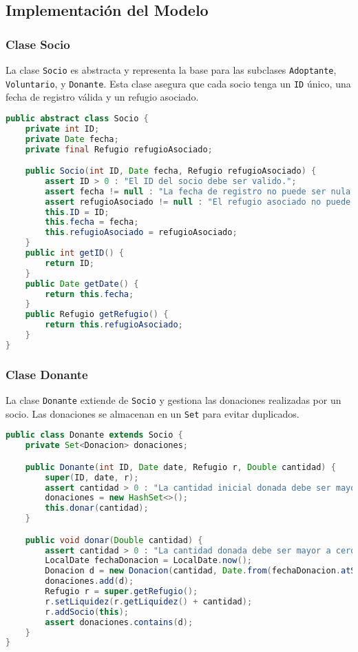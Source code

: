 \subsection{Implementación del Modelo}

\subsubsection{Clase Socio}
La clase \texttt{Socio} es abstracta y representa la base para las subclases \texttt{Adoptante}, \texttt{Voluntario}, y \texttt{Donante}. Esta clase asegura que cada socio tenga un \texttt{ID} único, una fecha de registro válida y un refugio asociado.

\begin{lstlisting}[language=Java]
public abstract class Socio {
    private int ID; 
    private Date fecha;
    private final Refugio refugioAsociado;

    public Socio(int ID, Date fecha, Refugio refugioAsociado) {
        assert ID > 0 : "El ID del socio debe ser valido.";
        assert fecha != null : "La fecha de registro no puede ser nula.";
        assert refugioAsociado != null : "El refugio asociado no puede ser nulo.";
        this.ID = ID;
        this.fecha = fecha;
        this.refugioAsociado = refugioAsociado;
    }
    public int getID() {
        return ID;
    }
    public Date getDate() {
        return this.fecha;
    }
    public Refugio getRefugio() {
        return this.refugioAsociado;
    }
}
\end{lstlisting}

\subsubsection{Clase Donante}
La clase \texttt{Donante} extiende de \texttt{Socio} y gestiona las donaciones realizadas por un socio. Las donaciones se almacenan en un \texttt{Set} para evitar duplicados.

\begin{lstlisting}[language=Java]
public class Donante extends Socio {
    private Set<Donacion> donaciones;

    public Donante(int ID, Date date, Refugio r, Double cantidad) {
        super(ID, date, r);
        assert cantidad > 0 : "La cantidad inicial donada debe ser mayor a cero.";
        donaciones = new HashSet<>();
        this.donar(cantidad);
    }

    public void donar(Double cantidad) {
        assert cantidad > 0 : "La cantidad donada debe ser mayor a cero.";
        LocalDate fechaDonacion = LocalDate.now();
        Donacion d = new Donacion(cantidad, Date.from(fechaDonacion.atStartOfDay(ZoneId.systemDefault()).toInstant()), this);
        donaciones.add(d);
        Refugio r = super.getRefugio();
        r.setLiquidez(r.getLiquidez() + cantidad);
        r.addSocio(this);
        assert donaciones.contains(d);
    }
}
\end{lstlisting}

